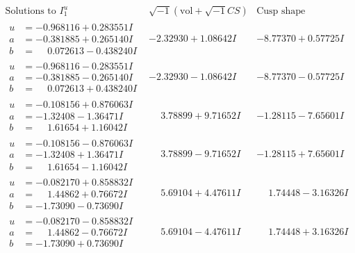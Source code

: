 \documentclass[1p]{elsarticle_modified}
\theoremstyle{definition}
\newcommand{\I}{\sqrt{-1}}
\begin{document}
$$\begin{array}{c|c|c}  
\text{Solutions to }I^u_{1}& \I (\text{vol} + \sqrt{-1}CS) & \text{Cusp shape}\\
 \hline 
\begin{aligned}
u &= -0.968116 + 0.283551 I \\
a &= -0.381885 + 0.265140 I \\
b &= \phantom{-}0.072613 - 0.438240 I\end{aligned}
 & -2.32930 + 1.08642 I & -8.77370 + 0.57725 I \\ \hline\begin{aligned}
u &= -0.968116 - 0.283551 I \\
a &= -0.381885 - 0.265140 I \\
b &= \phantom{-}0.072613 + 0.438240 I\end{aligned}
 & -2.32930 - 1.08642 I & -8.77370 - 0.57725 I \\ \hline\begin{aligned}
u &= -0.108156 + 0.876063 I \\
a &= -1.32408 - 1.36471 I \\
b &= \phantom{-}1.61654 + 1.16042 I\end{aligned}
 & \phantom{-}3.78899 + 9.71652 I & -1.28115 - 7.65601 I \\ \hline\begin{aligned}
u &= -0.108156 - 0.876063 I \\
a &= -1.32408 + 1.36471 I \\
b &= \phantom{-}1.61654 - 1.16042 I\end{aligned}
 & \phantom{-}3.78899 - 9.71652 I & -1.28115 + 7.65601 I \\ \hline\begin{aligned}
u &= -0.082170 + 0.858832 I \\
a &= \phantom{-}1.44862 + 0.76672 I \\
b &= -1.73090 - 0.73690 I\end{aligned}
 & \phantom{-}5.69104 + 4.47611 I & \phantom{-}1.74448 - 3.16326 I \\ \hline\begin{aligned}
u &= -0.082170 - 0.858832 I \\
a &= \phantom{-}1.44862 - 0.76672 I \\
b &= -1.73090 + 0.73690 I\end{aligned}
 & \phantom{-}5.69104 - 4.47611 I & \phantom{-}1.74448 + 3.16326 I \\ \hline\begin{aligned}

\end{aligned}
\end{array}$$
\end{document}
